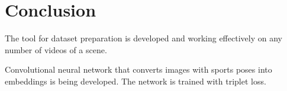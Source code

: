 \chapter{\label{chap:conclusion}Conclusion}

The tool for dataset preparation is developed and working effectively on any number of videos of a scene.
\blindtext

Convolutional neural network that converts images with sports poses into embeddings is being developed. The network is trained with triplet loss.
\blindtext

\blindtext

\blindtext

